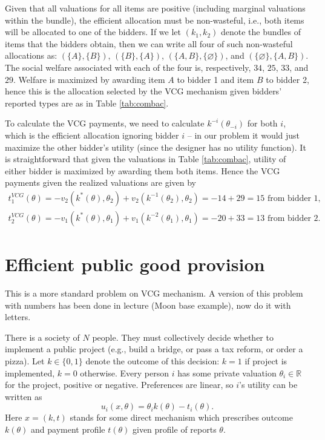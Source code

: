 \documentclass[a4paper]{article}
\begin{document}
	Given that all valuations for all items are positive (including marginal valuations within the bundle), the efficient allocation must be non-wasteful, i.e., both items will be allocated to one of the bidders. If we let $(k_1,k_2)$ denote the bundles of items that the bidders obtain, then we can write all four of such non-wasteful allocations as: $(\{A\},\{B\})$, $(\{B\},\{A\})$, $(\{A,B\},\{\varnothing\})$, and $(\{\varnothing\},\{A,B\})$. The social welfare associated with each of the four is, respectively, $34$, $25$, $33$, and $29$. Welfare is maximized by awarding item $A$ to bidder 1 and item $B$ to bidder 2, hence this is the allocation selected by the VCG mechanism given bidders' reported types are as in Table \ref{tab:combac}.
	
	To calculate the VCG payments, we need to calculate $k^{-i}(\theta_{-i})$ for both $i$, which is the efficient allocation ignoring bidder $i$ -- in our problem it would just maximize the other bidder's utility (since the designer has no utility function). It is straightforward that given the valuations in Table \ref{tab:combac}, utility of either bidder is maximized by awarding them both items. Hence the VCG payments given the realized valuations are given by
	\begin{align*}
		t_1^{VCG}(\theta) = -v_2(k^*(\theta),\theta_2) + v_2(k^{-1}(\theta_2),\theta_2) = -14+29 = 15 \text{ from bidder 1,}
		\\
		t_2^{VCG}(\theta) = -v_1(k^*(\theta),\theta_1) + v_1(k^{-2}(\theta_1),\theta_1) = -20+33 = 13 \text{ from bidder 2.}
	\end{align*}
\fi 



\section{Efficient public good provision}
	
	This is a more standard problem on VCG mechanism. A version of this problem with numbers has been done in lecture (Moon base example), now do it with letters.
	
	There is a society of $N$ people. They must collectively decide whether to implement a public project (e.g., build a bridge, or pass a tax reform, or order a pizza). Let $k \in \{0,1\}$ denote the outcome of this decision: $k=1$ if project is implemented, $k=0$ otherwise. Every person $i$ has some private valuation $\theta_i \in \mathbb{R}$ for the project, positive or negative. Preferences are linear, so $i$'s utility can be written as
	$$
		u_i(x,\theta) = \theta_i k(\theta) - t_i(\theta).
	$$
	Here $x=(k,t)$ stands for some direct mechanism which prescribes outcome $k(\theta)$ and payment profile $t(\theta)$ given profile of reports $\theta$.
	
\end{document}
